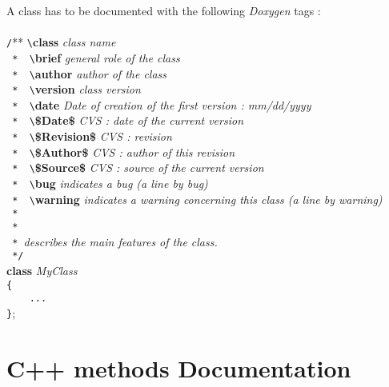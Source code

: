 \documentclass[a4paper,twoside,openright,makeidx,12pt]{report}
\begin{document}
A class has to be documented with the following \textit{Doxygen} tags :\\\\
\verb+/+** \verb+\+\textbf{class} \textit{class name} \\
\verb+ *  \+\textbf{brief} \textit{general role of the class} \\
\verb+ *  \+\textbf{author} \textit{author of the class} \\
\verb+ *  \+\textbf{version} \textit{class version} \\
\verb+ *  \+\textbf{date} \textit{Date of creation of the first version : mm/dd/yyyy} \\
\verb+ *  \+\textbf{\$Date\$} \textit{CVS : date of the current version }\\
\verb+ *  \+\textbf{\$Revision\$} \textit{CVS : revision }\\
\verb+ *  \+\textbf{\$Author\$} \textit{CVS : author of this revision }\\
\verb+ *  \+\textbf{\$Source\$} \textit{CVS : source of the current version }\\
\verb+ *  \+\textbf{bug} \textit{indicates a bug (a line by bug)} \\
\verb+ *  \+\textbf{warning} \textit{indicates a warning concerning this class (a line by warning)} \\
\verb+ *   +\\
\verb+ * + \\
\verb+ * +\textit{describes the main features of the class.} \\
\verb+ */ + \\
\textbf{class} \textit{MyClass} \\\verb+{+\\\verb+    ...+\\\verb+}+;


\section{C++ methods Documentation}
\end{document}
